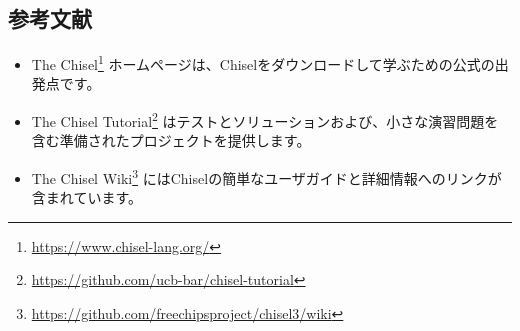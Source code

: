 \documentclass[%
    10pt,
    headinclude, footexclude,
    openright, %
    notitlepage,
    cleardoubleempty,
    headsepline,
    pointlessnumbers,
    bibtotoc, idxtotoc,
    ]{scrbook}
\newif\ifshoworiginal
\newif\ifshowtrans
\newcommand{\myref}[2]{\href{#1}{#2}}
\renewcommand{\myref}[2]{{#2}{\footnote{\url{#1}}}}
\begin{document}
\begin{flushleft}
\section{参考文献}
\fi

\ifshoworiginal
Here a list of further reading for digital design and Chisel:
\begin{itemize}
\item \myref{http://www.cambridge.org/es/academic/subjects/engineering/circuits-and-systems/digital-design-systems-approach}{Digital Design: A Systems Approach}, by William J. Dally and R. Curtis Harting,
is a modern textbook on digital design. It is available in two versions: using Verilog or VHDL as a hardware description language.
\end{itemize}
\fi

\ifshowtrans %
デジタル回路設計とChiselに関する参考文献をリストします
\begin{itemize}
\item \myref{http://www.cambridge.org/es/academic/subjects/engineering/circuits-and-systems/digital-design-systems-approach}{Digital Design: A Systems Approach}, by William J. Dally and R. Curtis Harting,
は、デジタル回路設計に関する最新の教科書です。ハードウェア記述言語としてVerilogとVHDLの2つのバージョンがあります。
\end{itemize}
\fi

\ifshoworiginal
The official Chisel documentation and further documents are available online:
\fi

\ifshowtrans %
Chiselの公式ドキュメントやその他の関連ドキュメントはオンラインで利用可能です。
\fi

\begin{itemize}

\item The \myref{https://www.chisel-lang.org/}{Chisel}
ホームページは、Chiselをダウンロードして学ぶための公式の出発点です。

\item The \myref{https://github.com/ucb-bar/chisel-tutorial}{Chisel Tutorial}
はテストとソリューションおよび、小さな演習問題を含む準備されたプロジェクトを提供します。

\item The \myref{https://github.com/freechipsproject/chisel3/wiki}{Chisel Wiki}
にはChiselの簡単なユーザガイドと詳細情報へのリンクが含まれています。


\end{itemize}
\end{flushleft}
\end{document}

